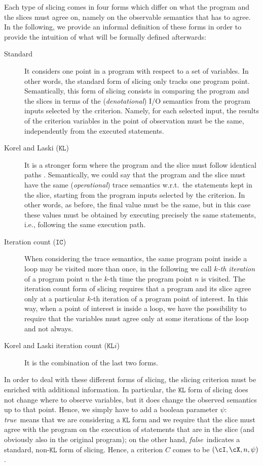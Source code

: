 \documentclass[prodmode,acmtocl]{acmsmall}
\def\crit{\ensuremath{C}\xspace}
\def\KL{\ensuremath{\mathtt{KL}}\xspace}
\def\KLi{\ensuremath{\mathtt{KL}i}\xspace}
\def\IC{\ensuremath{\mathtt{IC}}\xspace}
\newcommand{\false}{\mbox{\sl false}}
\newcommand{\true}{\mbox{\sl true}}
\newcommand{\0}{\mbox{\bf 0}}
\begin{document}
Each type of slicing comes in four forms which differ on what the
program and the slices must agree on, namely on the observable
semantics that has to agree.  In the following, we provide an informal
definition of these forms in order to provide the intuition of what
will be formally defined afterwards:
\begin{description}
\item[Standard] It considers one point in a program with respect to a
  set of variables. In other words, the standard form of slicing only
  tracks one program point.  Semantically, this form of slicing
  consists in comparing the program and the slices in terms of the
  ({\em denotational}) I/O semantics from the program inputs selected
  by the criterion. Namely, for each selected input, the results of
  the criterion variables in the point of observation must be the
  same, independently from the executed statements.
\item[Korel and Laski ($\KL$)] It is a stronger form where the program
  and the slice must follow identical paths
  \cite{KorelLaski}. Semantically, we could say that the program and
  the slice must have the same ({\em operational}) trace semantics
  w.r.t.\ the statements kept in the slice, starting from the program
  inputs selected by the criterion.  In other words, as before, the
  final value must be the same, but in this case these values must be
  obtained by executing precisely the same statements, i.e., following
  the same execution path.
\item[Iteration count ($\IC$)] When considering the trace semantics,
  the same program point inside a loop may be visited more than once,
  in the following we call {\em $k$-th iteration} of a program point
  $n$ the $k$-th time the program point $n$ is visited. The iteration
  count form of slicing requires that a program and its slice agree
  only at a particular $k$-th iteration of a program point of
  interest.  In this way, when a point of interest is inside a loop,
  we have the possibility to require that the variables must agree
  only at some iterations of the loop and not always.
\item[Korel and Laski iteration count ($\KLi$)] It is the combination
  of the last two forms.
\end{description}
In order to deal with these different forms of slicing, the slicing
criterion must be enriched with additional information.  In
particular, the $\KL$ form of slicing does not change where to observe
variables, but it does change the observed semantics up to that point.
Hence, we simply have to add a boolean parameter $\psi$: \true~means
that we are considering a $\KL$ form and we require that the slice
must agree with the program on the execution of statements that are in
the slice (and obviously also in the original program); on the other
hand, \false~indicates a standard, non-$\KL$ form of slicing.  Hence,
a criterion $\crit$ comes to be $(\cI,\cX,n,\psi)$.
\end{document}
